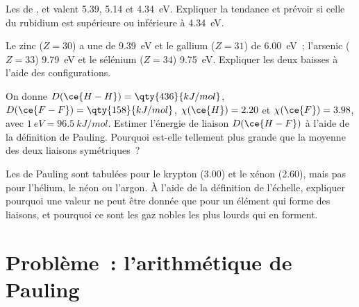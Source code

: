 \begin{exercise}[$\star\star$]\label{exo:b1:periodicity:9}
Les  de ,  et  valent
5.39, 5.14 et \qty{4.34}{eV}. Expliquer la tendance et prévoir si celle
du rubidium est supérieure ou inférieure à \qty{4.34}{eV}.
\end{exercise}

\begin{exercise}[$\star\star\star$]\label{exo:b1:periodicity:10}
Le zinc ($Z = 30$) a une  de
\qty{9.39}{eV} et le gallium ($Z = 31$) de \qty{6.00}{eV}~; l'arsenic
($Z = 33$) \qty{9.79}{eV} et le sélénium ($Z = 34$) \qty{9.75}{eV}.
Expliquer les deux baisses à l'aide des configurations.
\end{exercise}

\begin{exercise}[$\star\star\star$]\label{exo:b1:periodicity:11}
On donne $D(\ce{H-H}) = \qty{436}{kJ/mol}$, $D(\ce{F-F}) =
\qty{158}{kJ/mol}$, $\chi(\ce{H}) = 2.20$ et $\chi(\ce{F}) = 3.98$, avec
$\qty{1}{eV} = \qty{96.5}{kJ/mol}$. Estimer l'énergie de liaison
$D(\ce{H-F})$ à l'aide de la définition de Pauling. Pourquoi est-elle
tellement plus grande que la moyenne des deux liaisons symétriques~?
\end{exercise}

\begin{exercise}[$\star\star\star$]\label{exo:b1:periodicity:12}
Les  de Pauling sont tabulées pour le krypton (3.00) et
le xénon (2.60), mais pas pour l'hélium, le néon ou l'argon. À l'aide de
la définition de l'échelle, expliquer pourquoi une valeur ne peut être
donnée que pour un élément qui forme des liaisons, et pourquoi ce sont les
gaz nobles les plus lourds qui en forment.
\end{exercise}

\section{Problème~: l'arithmétique de Pauling}

